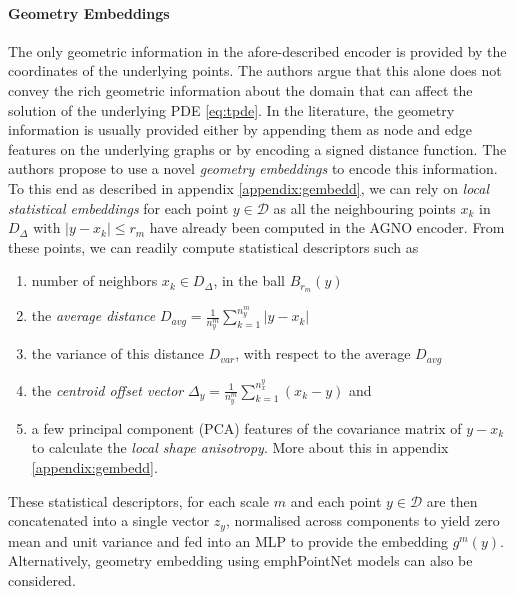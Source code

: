 \documentclass[reqno,10pt]{amsart}
\theoremstyle{plain}
\theoremstyle{definition}
\newcommand{\cal}[1]{\mathcal{#1}}
\begin{document}
\paragraph{\bf Geometry Embeddings}\label{par:geom_embeddings}
The only geometric information in the afore-described encoder is provided by the coordinates of the underlying points. The authors argue that this alone does not convey the rich geometric information about the domain that can affect the solution of the underlying PDE \ref{eq:tpde}. In the literature, the geometry information is usually provided either by appending them as node and edge features on the underlying graphs or by encoding a signed distance function. The authors propose to use a novel {\it geometry embeddings} to encode this information. To this end as described in appendix \ref{appendix:gembedd}, we can rely on {\it local statistical embeddings} for each point $y \in \cal D$ as all the neighbouring points $x_k$ in $D_\Delta$ with $|y-x_k| \leq r_m$ have already been computed in the AGNO encoder. From these points, we can readily compute statistical descriptors such as 
\begin{enumerate}\setlength{\itemsep}{0.8em}
    \item  number of neighbors $x_k \in D_\Delta$, in the ball $B_{r_m}(y)$
    \item the {\it average distance} $D_{avg} = \frac{1}{n_y^m} \sum_{k=1}^{n_y^m} |y-x_k|$
    \item the variance of this distance $D_{var}$, with respect to the average $D_{avg}$
    \item the {\it centroid offset vector} $\Delta_y = \frac{1}{n_y^m} \sum_{k=1}^{n_x^y}(x_k-y)$ and
    \item a few principal component (PCA) features of the covariance matrix of $y-x_k$ to calculate the {\it local shape anisotropy}. More about this in appendix \ref{appendix:gembedd}.
\end{enumerate}
These statistical descriptors, for each scale $m$ and each point $y \in \cal D$ are then concatenated into a single vector $z_y$, normalised across components to yield zero mean and unit variance and fed into an MLP to provide the embedding $g^m(y)$. Alternatively, geometry embedding using emphPointNet models \cite{RC2017} can also be considered.
\end{document}
